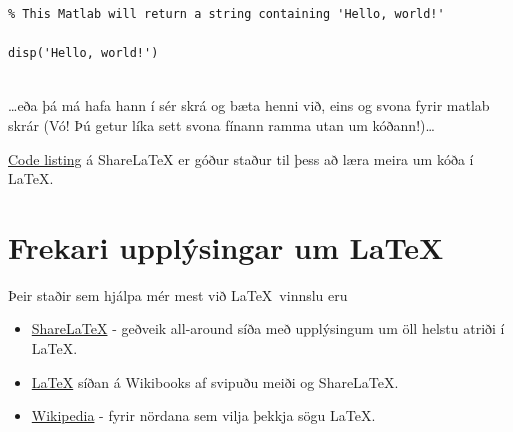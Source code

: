 \documentclass[a4paper]{article}
\begin{document}
\begin{lstlisting}
% This Matlab will return a string containing 'Hello, world!'

disp('Hello, world!')


\end{lstlisting}

\dots eða þá má hafa hann í sér skrá og bæta henni við, eins og svona fyrir matlab skrár (Vó! Þú getur líka sett svona fínann ramma utan um kóðann!)\dots



\href{https://www.sharelatex.com/learn/Code_listing}{Code listing} á ShareLaTeX er góður staður til þess að læra meira um kóða í \LaTeX.

\section{Frekari upplýsingar um \LaTeX}
Þeir staðir sem hjálpa mér mest við \LaTeX\ vinnslu eru

\begin{itemize}
	\item \href{https://www.sharelatex.com/learn/Main_Page}{ShareLaTeX} - geðveik all-around síða með upplýsingum um öll helstu atriði í \LaTeX.
    \item \href{https://en.wikibooks.org/wiki/LaTeX}{\LaTeX} síðan á Wikibooks af svipuðu meiði og ShareLaTeX.
    \item \href{https://en.wikipedia.org/wiki/LaTeX}{Wikipedia} - fyrir nördana sem vilja þekkja sögu \LaTeX.
\end{itemize}
\end{document}

